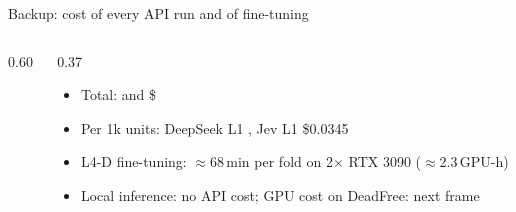\begin{frame}{Backup: cost of every API run and of fine-tuning}
  \begin{columns}[T]
    \begin{column}{0.60\textwidth}
      {\scriptsize\resizebox{\linewidth}{!}{}\par}
    \end{column}
    \begin{column}{0.37\textwidth}
      \begin{itemize}\small
        \item Total: \textyen{} and \$
        \item Per 1k units: DeepSeek L1 , Jev L1 \$0.0345
        \item L4-D fine-tuning: $\approx$68\,min per fold on 2$\times$ RTX 3090 ($\approx$2.3\,GPU-h)
        \item Local inference: no API cost; GPU cost on DeadFree: next frame
      \end{itemize}
    \end{column}
  \end{columns}
\end{frame}

